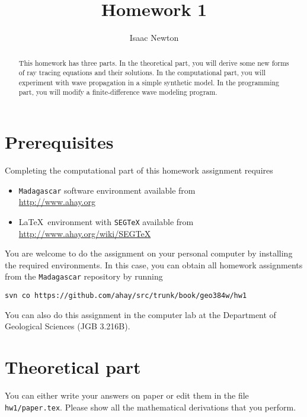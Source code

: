 \author{Isaac Newton} 
\title{Homework 1}


\begin{abstract}
  This homework has three parts. In the theoretical part, you will
  derive some new forms of ray tracing equations and their solutions.
  In the computational part, you will experiment with wave propagation
  in a simple synthetic model.  In the programming part, you will
  modify a finite-difference wave modeling program.
\end{abstract}

\section{Prerequisites}

Completing the computational part of this homework assignment requires
\begin{itemize}
\item \texttt{Madagascar} software environment available from \\
\url{http://www.ahay.org}
\item \LaTeX\ environment with \texttt{SEGTeX} available from \\ 
\url{http://www.ahay.org/wiki/SEGTeX}
\end{itemize}

You are welcome to do the assignment on your personal computer by
installing the required environments. In this case, you can obtain all
homework assignments from the \texttt{Madagascar} repository by running
\begin{verbatim}
svn co https://github.com/ahay/src/trunk/book/geo384w/hw1 
\end{verbatim}

You can also do this assignment in the computer lab at the Department
of Geological Sciences (JGB 3.216B).

\section{Theoretical part}

You can either write your answers on paper or edit them in the file
\verb#hw1/paper.tex#. Please show all the mathematical
derivations that you perform.


